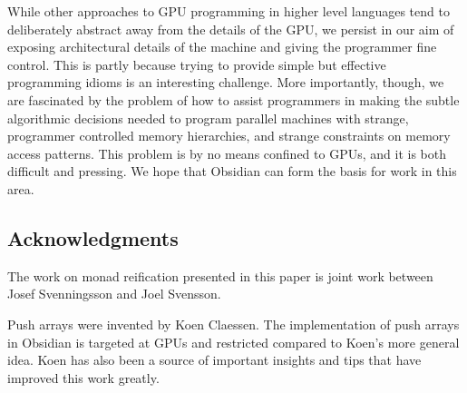 While other approaches to GPU programming in higher level languages tend to deliberately abstract away from the details of the GPU, we persist in our aim of exposing architectural details of
the machine and giving the programmer fine control.
This is partly because trying to provide simple
but effective programming idioms is an interesting challenge.
More importantly, though, we are fascinated
by the problem of how to assist
programmers in making the subtle algorithmic decisions needed
to program
parallel machines with strange, programmer controlled
 memory hierarchies, and strange
constraints on memory access patterns. This problem is by no means
confined to GPUs, and it is both difficult and pressing.
We hope that Obsidian can form the basis for work in this area.









\subsection*{Acknowledgments}
The work on monad reification presented in this paper is joint 
work between Josef Svenningsson and Joel Svensson. 

Push arrays were invented by Koen Claessen. The implementation 
of push arrays in Obsidian is targeted at 
GPUs and restricted compared to Koen's more general idea. Koen has 
also been a source of important insights and tips that have
improved this work greatly. 

